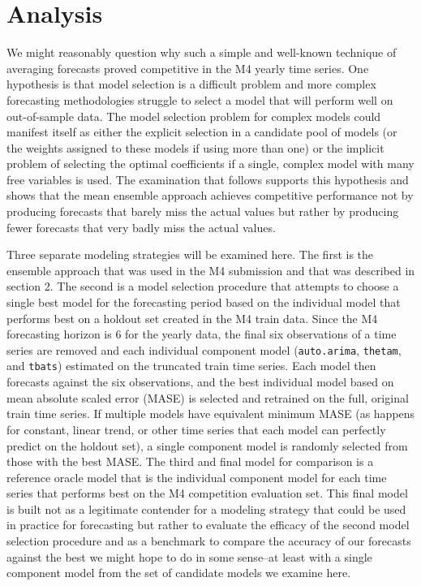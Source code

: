 \documentclass[11pt,3p,review,authoryear]{elsarticle}
\begin{document}
\section{Analysis}
We might reasonably question why such a simple and well-known technique of averaging forecasts proved competitive in the M4 yearly time series. One hypothesis is that model selection is a difficult problem and more complex forecasting methodologies struggle to select a model that will perform well on out-of-sample data. The model selection problem for complex models could manifest itself as either the explicit selection in a candidate pool of models (or the weights assigned to these models if using more than one) or the implicit problem of selecting the optimal coefficients if a single, complex model with many free variables is used. The examination that follows supports this hypothesis and shows that the mean ensemble approach achieves competitive performance not by producing forecasts that barely miss the actual values but rather by producing fewer forecasts that very badly miss the actual values.


Three separate modeling strategies will be examined here. The first is the ensemble approach that was used in the M4 submission and that was described in section 2. The second is a model selection procedure that attempts to choose a single best model for the forecasting period based on the individual model that performs best on a holdout set created in the M4 train data. Since the M4 forecasting horizon is 6 for the yearly data, the final six observations of a time series are removed and each individual component model (\texttt{auto.arima}, \texttt{thetam}, and \texttt{tbats}) estimated on the truncated train time series. Each model then forecasts against the six observations, and the best individual model based on mean absolute scaled error (MASE) is selected and retrained on the full, original train time series. If multiple models have equivalent minimum MASE (as happens for constant, linear trend, or other time series that each model can perfectly predict on the holdout set), a single component model is randomly selected from those with the best MASE. The third and final model for comparison is a reference oracle model that is the individual component model for each time series that performs best on the M4 competition evaluation set. This final model is built not as a legitimate contender for a modeling strategy that could be used in practice for forecasting but rather to evaluate the efficacy of the second model selection procedure and as a benchmark to compare the accuracy of our forecasts against the best we might hope to do in some sense--at least with a single component model from the set of candidate models we examine here.
\end{document}
